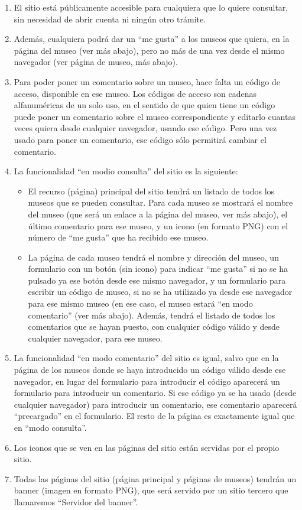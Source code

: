 \begin{enumerate}
\item El sitio está públicamente accesible para cualquiera que lo quiere consultar, sin necesidad de abrir cuenta ni ningún otro trámite.

\item Además, cualquiera podrá dar un ``me gusta'' a los museos que quiera, en la página del museo (ver más abajo), pero no más de una vez desde el mismo navegador (ver página de museo, más abajo).

\item Para poder poner un comentario sobre un museo, hace falta un código de acceso, disponible en ese museo. Los códigos de acceso son cadenas alfanuméricas de un solo uso, en el sentido de que quien tiene un código puede poner un comentario sobre el museo correspondiente y editarlo cuantas veces quiera desde cualquier navegador, usando ese código. Pero una vez usado para poner un comentario, ese código sólo permitirá cambiar el comentario.

\item La funcionalidad ``en modio consulta'' del sitio es la siguiente:
  \begin{itemize}
  \item El recurso (página) principal del sitio tendrá un listado de todos los museos que se pueden consultar. Para cada museo se mostrará el nombre del museo (que será un enlace a la página del museo, ver más abajo), el último comentario para ese museo, y un icono (en formato PNG) con el número de ``me gusta'' que ha recibido ese museo.
  \item La página de cada museo tendrá el nombre y dirección del museo, un formulario con un botón (sin icono) para indicar ``me gusta'' si no se ha pulsado ya ese botón desde ese mismo navegador, y un formulario para escribir un código de museo, si no se ha utilizado ya desde ese navegador para ese mismo museo (en ese caso, el museo estará ``en modo comentario'' (ver más abajo). Además, tendrá el listado de todos los comentarios que se hayan puesto, con cualquier código válido y desde cualquier navegador, para ese museo.
  \end{itemize}

\item La funcionalidad ``en modo comentario'' del sitio es igual, salvo que en la página de los museos donde se haya introducido un código válido desde ese navegador, en lugar del formulario para introducir el código aparecerá un formulario para introducir un comentario. Si ese código ya  se ha usado (desde cualquier navegador) para introducir un comentario, ese comentario aparecerá ``precargado'' en el formulario. El resto de la página es exactamente igual que en ``modo consulta''.

\item Los iconos que se ven en las páginas del sitio están servidas por el propio sitio.

\item Todas las páginas del sitio (página principal y páginas de museos) tendrán un banner (imagen en formato PNG), que será servido por un sitio tercero que llamaremos ``Servidor del banner''.
\end{enumerate}


